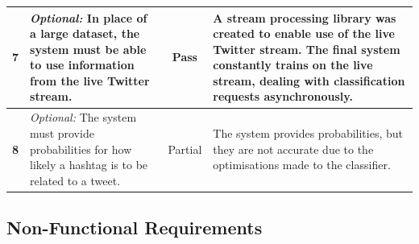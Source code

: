 \documentclass[11pt,a4paper]{report}
\begin{document}
\begin{center}
\begin{longtable}{|c|p{5.5cm}||c|p{5cm}|}
        \hline
        \textbf{7} & \emph{Optional:} In place of a large dataset, the system must be able to use information from the live Twitter stream. & Pass & A stream processing library was created to enable use of the live Twitter stream. The final system constantly trains on the live stream, dealing with classification requests asynchronously. \\
        \hline
        \textbf{8} & \emph{Optional:} The system must provide probabilities for how likely a hashtag is to be related to a tweet. & Partial & The system provides probabilities, but they are not accurate due to the optimisations made to the classifier. \\
    \end{longtable}
\end{center}

\subsection{Non-Functional Requirements}
\end{document}
